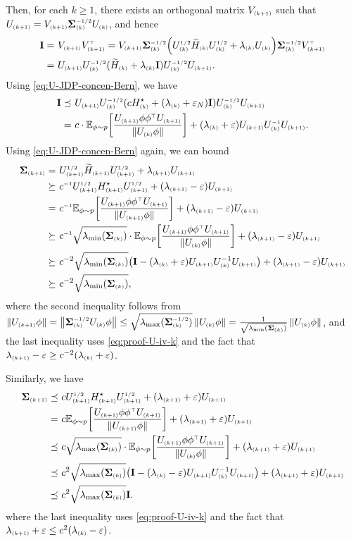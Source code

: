 Then, for each $k\geq 1$, there exists an orthogonal matrix $V\kp$ such that $U\kp=V\kp\cov\kk\isq U\kk$, and hence
\begin{align*}
    \id=&~V\kp V\kp\tp
    =V\kp \cov\kk\isq \paren{ U\kk\sq \til H\kk U\kk\sq+\lambda\kk U\kk }\cov\kk\isq V\kp\tp \\
    =&~ U\kp U\kk\isq (\til H\kk+\lambda\kk\id)U\kk\isq U\kp.
\end{align*}
Using \eqref{eq:U-JDP-concen-Bern}, we have
\begin{align*}
    \id\preceq&~ U\kp U\kk\isq (c\Hs\kk+(\lambda\kk+\epsN)\id)U\kk\isq U\kp \\
    =&~c\cdot \Ep{ \frac{U\kp \x\x\tp U\kp}{\nrm{U\kk\x}} }+(\lambda\kk+\eps)U\kp U\kk\iv U\kp.
\end{align*}
Using \eqref{eq:U-JDP-concen-Bern} again, we can bound
\begin{align*}
    \cov\kp=&~ U\kp\sq \til H\kp U\kp\sq+\lambda\kp U\kp \\
    \succeq&~ c\iv U\kp\sq \Hs\kp U\kp\sq +(\lambda\kp-\eps) U\kp \\
    =&~ c\iv \Ep{ \frac{U\kp \x\x\tp U\kp}{\nrm{U\kp\x}} }+(\lambda\kp-\eps) U\kp \\
    \succeq&~ c\iv\sqrt{ \lmin(\cov\kk) }\cdot \Ep{ \frac{U\kp \x\x\tp U\kp}{\nrm{U\kk\x}} } +(\lambda\kp-\eps) U\kp \\
    \succeq&~ c^{-2} \sqrt{ \lmin(\cov\kk) }\paren{ \id-(\lambda\kk+\eps)U\kp U\kk^{-1}U\kp } +(\lambda\kp-\eps) U\kp \\
    \succeq&~ c^{-2} \sqrt{ \lmin(\cov\kk) },
\end{align*}
where the second inequality follows from $\nrm{U\kp\x}=\nrm{\cov\kk\isq U\kk\x}\leq \sqrt{\lmax(\cov\kk\isq)}\nrm{U\kk\x}=\frac{1}{\sqrt{\lmin(\cov\kk)}}\nrm{U\kk\x}$, and the last inequality uses \eqref{eq:proof-U-iv-k} and the fact that $\lambda\kp-\eps\geq c^{-2}(\lambda\kk+\eps)$. 

Similarly, we have
\begin{align*}
    \cov\kp
    \preceq&~ c U\kp\sq \Hs\kp U\kp\sq +(\lambda\kp+\eps) U\kp \\
    =&~ c\Ep{ \frac{U\kp \x\x\tp U\kp}{\nrm{U\kp\x}} }+(\lambda\kp+\eps) U\kp \\
    \preceq&~ c\sqrt{ \lmax(\cov\kk) }\cdot \Ep{ \frac{U\kp \x\x\tp U\kp}{\nrm{U\kk\x}} } +(\lambda\kp+\eps) U\kp \\
    \preceq&~ c^2 \sqrt{ \lmax(\cov\kk) }\paren{ \id-(\lambda\kk-\eps)U\kp U\kk^{-1}U\kp } +(\lambda\kp+\eps) U\kp \\
    \preceq&~ c^2 \sqrt{ \lmax(\cov\kk) }\id.
\end{align*}
where the last inequality uses \eqref{eq:proof-U-iv-k} and the fact that $\lambda\kp+\eps\leq c^2(\lambda\kk-\eps)$.

